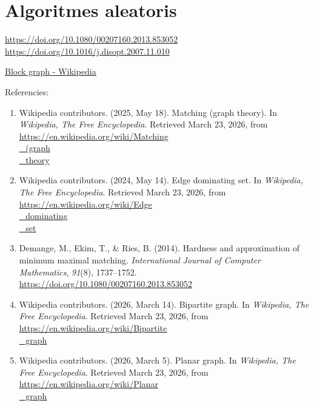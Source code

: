 \section{Algoritmes aleatoris}
\href{https://doi.org/10.1080/00207160.2013.853052}{https://doi.org/10.1080/00207160.2013.853052}
\href{https://doi.org/10.1016/j.disopt.2007.11.010}{https://doi.org/10.1016/j.disopt.2007.11.010}

\href{https://en.wikipedia.org/wiki/Block\_graph}{Block graph - Wikipedia}

Referencies:

\begin{enumerate}
\item Wikipedia contributors. (2025, May 18). Matching (graph theory). In \textit{Wikipedia, The Free Encyclopedia}. Retrieved March 23, 2026, from \href{https://en.wikipedia.org/wiki/Matching\\\_(graph\\\_theory}{https://en.wikipedia.org/wiki/Matching\\\_(graph\\\_theory}
\item Wikipedia contributors. (2024, May 14). Edge dominating set. In \textit{Wikipedia, The Free Encyclopedia}. Retrieved March 23, 2026, from \href{https://en.wikipedia.org/wiki/Edge\\\_dominating\\\_set}{https://en.wikipedia.org/wiki/Edge\\\_dominating\\\_set}
\item Demange, M., Ekim, T., \& Ries, B. (2014). Hardness and approximation of minimum maximal matching. \textit{International Journal of Computer Mathematics}, \textit{91}(8), 1737--1752. \href{https://doi.org/10.1080/00207160.2013.853052}{https://doi.org/10.1080/00207160.2013.853052}
\item Wikipedia contributors. (2026, March 14). Bipartite graph. In \textit{Wikipedia, The Free Encyclopedia}. Retrieved March 23, 2026, from \href{https://en.wikipedia.org/wiki/Bipartite\\\_graph}{https://en.wikipedia.org/wiki/Bipartite\\\_graph}
\item Wikipedia contributors. (2026, March 5). Planar graph. In \textit{Wikipedia, The Free Encyclopedia}. Retrieved March 23, 2026, from \href{https://en.wikipedia.org/wiki/Planar\\\_graph}{https://en.wikipedia.org/wiki/Planar\\\_graph}

\end{enumerate}
